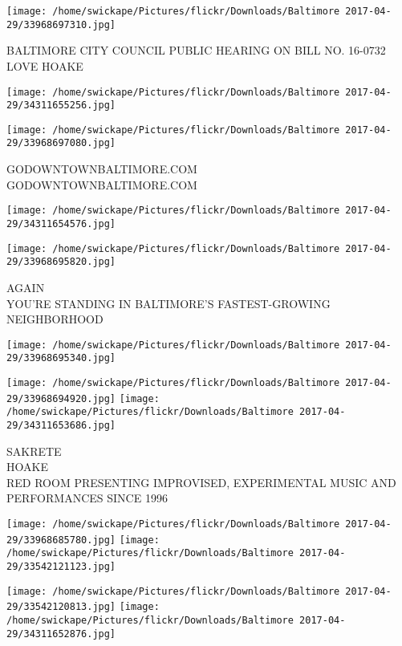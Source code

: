 \documentclass[10pt,letterpaper]{article}
\begin{document}
\vspace{0.25in}
\texttt{[image: /home/swickape/Pictures/flickr/Downloads/Baltimore 2017-04-29/33968697310.jpg]}

BALTIMORE CITY COUNCIL PUBLIC HEARING ON BILL NO. 16{-}0732\\
LOVE HOAKE\\
\pagebreak

\texttt{[image: /home/swickape/Pictures/flickr/Downloads/Baltimore 2017-04-29/34311655256.jpg]}

\vspace{0.25in}
\texttt{[image: /home/swickape/Pictures/flickr/Downloads/Baltimore 2017-04-29/33968697080.jpg]}

GODOWNTOWNBALTIMORE.COM\\
GODOWNTOWNBALTIMORE.COM\\
\pagebreak

\texttt{[image: /home/swickape/Pictures/flickr/Downloads/Baltimore 2017-04-29/34311654576.jpg]}

\vspace{0.25in}
\texttt{[image: /home/swickape/Pictures/flickr/Downloads/Baltimore 2017-04-29/33968695820.jpg]}

AGAIN\\
YOU'RE STANDING IN BALTIMORE'S FASTEST{-}GROWING NEIGHBORHOOD\\
\pagebreak

\texttt{[image: /home/swickape/Pictures/flickr/Downloads/Baltimore 2017-04-29/33968695340.jpg]}

\vspace{0.25in}
\texttt{[image: /home/swickape/Pictures/flickr/Downloads/Baltimore 2017-04-29/33968694920.jpg]}
\texttt{[image: /home/swickape/Pictures/flickr/Downloads/Baltimore 2017-04-29/34311653686.jpg]}

SAKRETE\\
HOAKE\\
RED ROOM PRESENTING IMPROVISED, EXPERIMENTAL MUSIC AND PERFORMANCES SINCE 1996\\
\pagebreak

\texttt{[image: /home/swickape/Pictures/flickr/Downloads/Baltimore 2017-04-29/33968685780.jpg]}
\texttt{[image: /home/swickape/Pictures/flickr/Downloads/Baltimore 2017-04-29/33542121123.jpg]}

\texttt{[image: /home/swickape/Pictures/flickr/Downloads/Baltimore 2017-04-29/33542120813.jpg]}
\texttt{[image: /home/swickape/Pictures/flickr/Downloads/Baltimore 2017-04-29/34311652876.jpg]}
\end{document}
